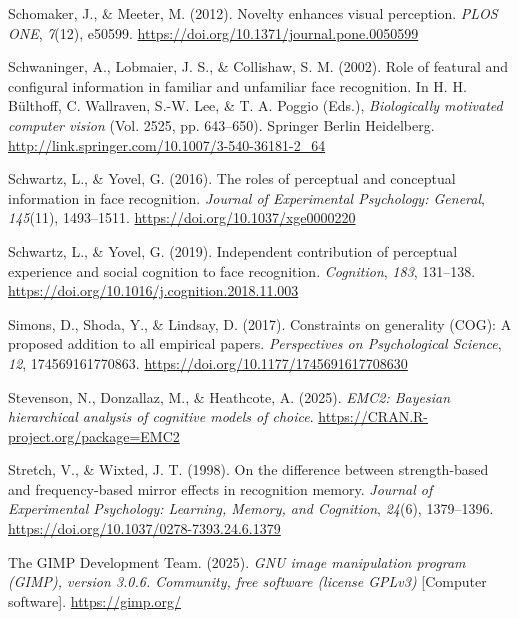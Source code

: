 \documentclass[
  letterpaper,
  DIV=11,
  numbers=noendperiod]{scrartcl}
\newlength{\cslhangindent}
\newenvironment{CSLReferences}[2] %
 {\begin{list}{}{%
  \setlength{\itemindent}{0pt}
  \setlength{\leftmargin}{0pt}
  \setlength{\parsep}{0pt}
  \ifodd #1
   \setlength{\leftmargin}{\cslhangindent}
   \setlength{\itemindent}{-1\cslhangindent}
  \fi
  \setlength{\itemsep}{#2\baselineskip}}}
 {\end{list}}
\begin{document}
\begin{CSLReferences}{1}{0}
Schomaker, J., \& Meeter, M. (2012). Novelty enhances visual perception.
\emph{PLOS ONE}, \emph{7}(12), e50599.
\url{https://doi.org/10.1371/journal.pone.0050599}

Schwaninger, A., Lobmaier, J. S., \& Collishaw, S. M. (2002). Role of
featural and configural information in familiar and unfamiliar face
recognition. In H. H. Bülthoff, C. Wallraven, S.-W. Lee, \& T. A. Poggio
(Eds.), \emph{Biologically motivated computer vision} (Vol. 2525, pp.
643--650). Springer Berlin Heidelberg.
\url{http://link.springer.com/10.1007/3-540-36181-2_64}

Schwartz, L., \& Yovel, G. (2016). The roles of perceptual and
conceptual information in face recognition. \emph{Journal of
Experimental Psychology: General}, \emph{145}(11), 1493--1511.
\url{https://doi.org/10.1037/xge0000220}

Schwartz, L., \& Yovel, G. (2019). Independent contribution of
perceptual experience and social cognition to face recognition.
\emph{Cognition}, \emph{183}, 131--138.
\url{https://doi.org/10.1016/j.cognition.2018.11.003}

Simons, D., Shoda, Y., \& Lindsay, D. (2017). Constraints on generality
(COG): A proposed addition to all empirical papers. \emph{Perspectives
on Psychological Science}, \emph{12}, 174569161770863.
\url{https://doi.org/10.1177/1745691617708630}

Stevenson, N., Donzallaz, M., \& Heathcote, A. (2025). \emph{EMC2:
Bayesian hierarchical analysis of cognitive models of choice}.
\url{https://CRAN.R-project.org/package=EMC2}

Stretch, V., \& Wixted, J. T. (1998). On the difference between
strength-based and frequency-based mirror effects in recognition memory.
\emph{Journal of Experimental Psychology: Learning, Memory, and
Cognition}, \emph{24}(6), 1379--1396.
\url{https://doi.org/10.1037/0278-7393.24.6.1379}

The GIMP Development Team. (2025). \emph{GNU image manipulation program
(GIMP), version 3.0.6. Community, free software (license GPLv3)}
{[}Computer software{]}. \url{https://gimp.org/}


\end{CSLReferences}
\end{document}
